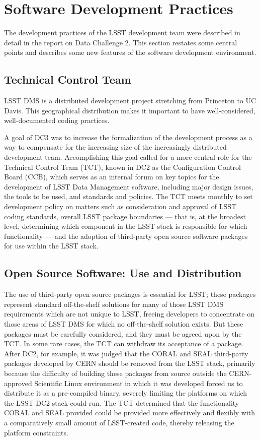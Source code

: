 
\section{Software Development Practices}

The development practices of the LSST development team were described in detail
in the report on Data Challenge 2. This section restates some central points and
describes some new features of the software development environment.

\subsection{Technical Control Team}

LSST DMS is a distributed development project stretching from Princeton to UC
Davis. This geographical distribution makes it important to have
well-considered, well-documented coding practices.

A goal of DC3 was to increase the formalization of the development process as a
way to compensate for the increasing size of the increasingly distributed
development team. Accomplishing this goal called for a more central role for the
Technical Control Team (TCT), known in DC2 as the Configuration Control Board
(CCB), which serves as an internal forum on key topics for the development of
LSST Data Management software, including major design issues, the tools to be
used, and standards and policies. The TCT meets monthly to set development
policy on matters such as consideration and approval of LSST coding standards,
overall LSST package boundaries --- that is, at the broadest level, determining
which component in the LSST stack is responsible for which functionality --- and
the adoption of third-party open source software packages for use within the
LSST stack.

\subsection{Open Source Software: Use and Distribution}

The use of third-party open source packages is essential for LSST; these
packages represent standard off-the-shelf solutions for many of those LSST DMS
requirements which are not unique to LSST, freeing developers to concentrate on
those areas of LSST DMS for which no off-the-shelf solution exists. But these
packages must be carefully considered, and they must be agreed upon by the TCT.
In some rare cases, the TCT can withdraw its acceptance of a package. After DC2,
for example, it was judged that the CORAL and SEAL third-party packages
developed by CERN should be removed from the LSST stack, primarily because the
difficulty of building these packages from source outside the CERN-approved
Scientific Linux environment in which it was developed forced us to distribute
it as a pre-compiled binary, severely limiting the platforms on which the LSST
DC2 stack could run. The TCT determined that the functionality CORAL and SEAL
provided could be provided more effectively and flexibly with a comparatively
small amount of LSST-created code, thereby releasing the platform constraints.

